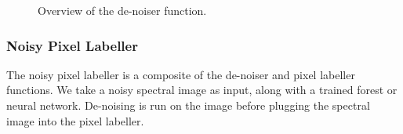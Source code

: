 \documentclass[12pt,twoside,notitlepage]{report}
\begin{document}
\begin{figure}[H]
{\begin{tikzpicture}[node distance=2cm,>=stealth',bend angle=45,auto]
                                    
                            \end{tikzpicture}
                        }

                    \caption{Overview of the de-noiser function.}
                \end{figure} 




            \subsubsection{Noisy Pixel Labeller}
                The noisy pixel labeller is a composite of the de-noiser and pixel labeller functions. We take a noisy 
                spectral image as input, along with a trained forest or neural network. De-noising is run on the image 
                before plugging the spectral image into the pixel labeller.
\end{document}
